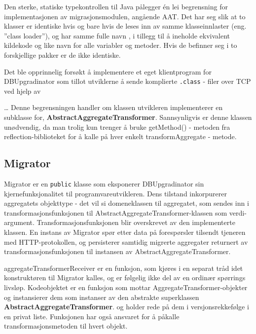 
Den sterke, statiske typekontrollen til Java pålegger én lei begrensning for implementasjonen av migrasjonsmodulen, angående AAT. Det har seg slik at to klasser er identiske hvis og bare hvis de leses inn av samme klasseinnlaster (eng. ''class loader''), og har samme fulle navn \citep{lindholm1999}, i tillegg til å ineholde ekvivalent kildekode og like navn for alle variabler og metoder. Hvis de befinner seg i to forskjellige pakker er de ikke identiske.

Det ble opprinnelig forsøkt å implementere et eget klientprogram for DBUpgradinator som tillot utviklerne å sende komplierte \texttt{.class} - filer over TCP ved hjelp av 

\ldots
Denne begrensningen handler om klassen utvikleren implementerer en subklasse for, \textbf{AbstractAggregateTransformer}. Sannsynligvis er denne klassen unødvendig, da man trolig kun trenger å bruke getMethod() - metoden fra reflection-biblioteket for å kalle på hver enkelt transformAggregate - metode.

\subsection{Migrator}

Migrator er en \texttt{public} klasse som eksponerer DBUpgradinator sin kjernefunksjonalitet til programvareutvikleren. Dens tilstand inkorpurerer aggregatets objekttype - det vil si domeneklassen til aggregatet, som sendes inn i transformasjonsfunksjonen til AbstractAggregateTransformer-klassen som verdi-argument. Transformasjonsfunksjonen blir overskrevet av den implementerte klassen. En instans av Migrator spør etter data på forespørsler tilsendt tjeneren med HTTP-protokollen, og persisterer samtidig migrerte aggregater returnert av transformasjonsfunksjonen til instansen av AbstractAggregateTransformer.

aggregateTransformerReceiver er en funksjon, som kjøres i en separat tråd idet konstruktøren til Migrator kalles, og er følgelig ikke del av en ordinær spørrings livsløp. Kodeobjektet er en funksjon som mottar AggregateTransformer-objekter og instansierer dem som instanser av den abstrakte superklassen \textbf{AbstractAggregateTransformer}. og holder rede på dem i versjonsrekkefølge i en privat liste. Funksjonen har også ansvaret for å påkalle transformasjonsmetoden til hvert objekt.

